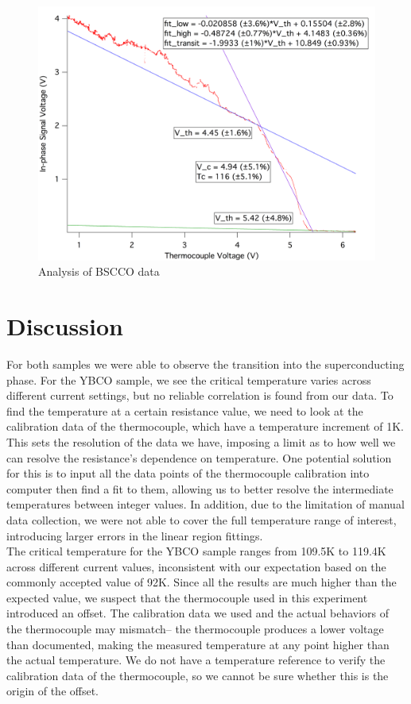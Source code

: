 \documentclass[prb,preprint]{revtex4-1}
\begin{document}
\begin{figure}[h]
\centering
\includegraphics[width=14cm]{bscco_heating.png}
\caption{Analysis of BSCCO data}
\label{bsccoraw}
\end{figure}



\section{Discussion}

For both samples we were able to observe the transition into the superconducting phase. For the YBCO sample, we see the critical temperature varies across different current settings, but no reliable correlation is found from our data. To find the temperature at a certain resistance value, we need to look at the calibration data of the thermocouple, which have a temperature increment of 1K. This sets the resolution of the data we have, imposing a limit as to how well we can resolve the resistance's dependence on temperature. One potential solution for this is to input all the data points of the thermocouple calibration into computer then find a fit to them, allowing us to better resolve the intermediate temperatures between integer values. In addition, due to the limitation of manual data collection, we were not able to cover the full temperature range of interest, introducing larger errors in the linear region fittings.\\

The critical temperature for the YBCO sample ranges from 109.5K to 119.4K across different current values, inconsistent with our expectation based on the commonly accepted value of 92K. Since all the results are much higher than the expected value, we suspect that the thermocouple used in this experiment introduced an offset. The calibration data we used and the actual behaviors of the thermocouple may mismatch-- the thermocouple produces a lower voltage than documented, making the measured temperature at any point higher than the actual temperature. We do not have a temperature reference to verify the calibration data of the thermocouple, so we cannot be sure whether this is the origin of the offset. \\
\end{document}
